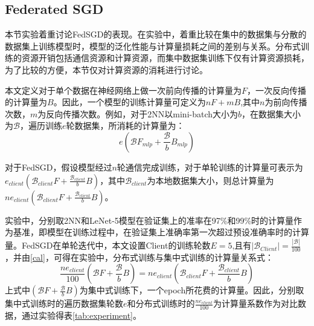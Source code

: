 \documentclass[zihao = -4,cn]{oucart}
\begin{document}
\subsection{Federated SGD}
本节实验着重讨论FedSGD的表现。在实验中，着重比较在集中的数据集与分散的数据集上训练模型时，模型的泛化性能与计算量损耗之间的差别与关系。分布式训练的资源开销包括通信资源和计算资源，而集中数据集训练下仅有计算资源损耗，为了比较的方便，本节仅对计算资源的消耗进行讨论。\par
本文定义对于单个数据在神经网络上做一次前向传播的计算量为$F$，一次反向传播的计算量为$B$。因此，一个模型的训练计算量可定义为$nF+mB$,其中$n$为前向传播次数，$m$为反向传播次数。例如，对于2NN以mini-batch大小为$b$，在数据集大小为$\mathcal{B}$，遍历训练$e$轮数据集，所消耗的计算量为：
\begin{equation}
\label{cal}
e(\mathcal{B}F_{mlp}+\frac{\mathcal{B}}{b}B_{mlp})
\end{equation}
\par
对于FedSGD，假设模型经过$n$轮通信完成训练，对于单轮训练的计算量可表示为$e_{client}(\mathcal{B}_{client}F+\frac{\mathcal{B}_{client}}{b}B)$，其中$\mathcal{B}_{client}$为本地数据集大小，则总计算量为$ne_{client}(\mathcal{B}_{client}F+\frac{\mathcal{B}_{client}}{b}B)$。\par
实验中，分别取2NN和LeNet-5模型在验证集上的准率在97\%和99\%时的计算量作为基准，即模型在训练过程中，在验证集上准确率第一次超过预设准确率时的计算量。FedSGD在单轮迭代中，本文设置Client的训练轮数$E=5$,且有$|\mathcal{B}_{Client}|=\frac{|\mathcal{B}|}{100}$，并由\ref{cal}，可得在实验中，分布式训练与集中式训练的计算量关系式：
\begin{equation}
\frac{ne_{client}}{100}(\mathcal{B}F+\frac{\mathcal{B}}{b}B) = ne_{client}(\mathcal{B}_{client}F+\frac{\mathcal{B}_{client}}{b}B)
\end{equation}
上式中$(\mathcal{B}F+\frac{\mathcal{B}}{b}B)$为集中式训练下，一个epoch所花费的计算量。因此，分别取集中式训练时的遍历数据集轮数$e$和分布式训练时的$\frac{ne_{client}}{100}$为计算量系数作为对比数据，通过实验得表\ref{tab:experiment}。\par
\end{document}

